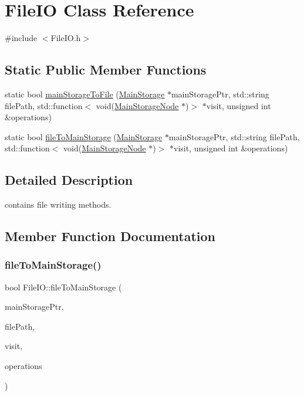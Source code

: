 \hypertarget{class_file_i_o}{}\section{File\+IO Class Reference}
\label{class_file_i_o}


{\ttfamily \#include $<$File\+I\+O.\+h$>$}

\subsection*{Static Public Member Functions}
\begin{DoxyCompactItemize}
\item 
static bool \hyperlink{class_file_i_o_a7869794d3446ce408a9a8248921e6d5a}{main\+Storage\+To\+File} (\hyperlink{class_main_storage}{Main\+Storage} $\ast$main\+Storage\+Ptr, std\+::string file\+Path, std\+::function$<$ void(\hyperlink{class_main_storage_node}{Main\+Storage\+Node} $\ast$)$>$ $\ast$visit, unsigned int \&operations)
\item 
static bool \hyperlink{class_file_i_o_aa5a2d658d2b6cdfbc222c3e73f25a110}{file\+To\+Main\+Storage} (\hyperlink{class_main_storage}{Main\+Storage} $\ast$main\+Storage\+Ptr, std\+::string file\+Path, std\+::function$<$ void(\hyperlink{class_main_storage_node}{Main\+Storage\+Node} $\ast$)$>$ $\ast$visit, unsigned int \&operations)
\end{DoxyCompactItemize}


\subsection{Detailed Description}
contains file writing methods. 

\subsection{Member Function Documentation}
\mbox{\label{class_file_i_o_aa5a2d658d2b6cdfbc222c3e73f25a110}} 
\subsubsection{\texorpdfstring{file\+To\+Main\+Storage()}{fileToMainStorage()}}
{\footnotesize\ttfamily bool File\+I\+O\+::file\+To\+Main\+Storage (\begin{DoxyParamCaption}\item[{\hyperlink{class_main_storage}{Main\+Storage} $\ast$}]{main\+Storage\+Ptr,  }\item[{std\+::string}]{file\+Path,  }\item[{std\+::function$<$ void(\hyperlink{class_main_storage_node}{Main\+Storage\+Node} $\ast$)$>$ $\ast$}]{visit,  }\item[{unsigned int \&}]{operations }\end{DoxyParamCaption})\hspace{0.3cm}{\ttfamily [static]}}

